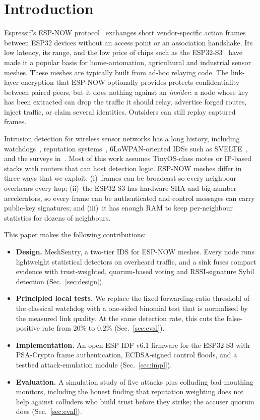 \documentclass[conference]{IEEEtran}
\begin{document}
\section{Introduction}
Espressif's ESP-NOW protocol~\cite{espnow} exchanges short vendor-specific
action frames between ESP32 devices without an access point or an association
handshake. Its low latency, its range, and the low price of chips such as the
ESP32-S3~\cite{esp32s3ds} have made it a popular basis for home-automation,
agricultural and industrial sensor meshes. These meshes are typically built
from ad-hoc relaying code. The link-layer encryption that ESP-NOW optionally
provides protects confidentiality between paired peers, but it does nothing
against an \emph{insider}: a node whose key has been extracted can drop the
traffic it should relay, advertise forged routes, inject traffic, or claim
several identities. Outsiders can still replay captured frames.

Intrusion detection for wireless sensor networks has a long history,
including watchdogs~\cite{marti2000watchdog}, reputation
systems~\cite{buchegger2002confidant,ganeriwal2008rfsn}, 6LoWPAN-oriented IDSs such as
SVELTE~\cite{raza2013svelte}, and the surveys
in~\cite{butun2014survey,zarpelao2017survey}. Most of this work assumes
TinyOS-class motes or IP-based stacks with routers that can host detection
logic. ESP-NOW meshes differ in three ways that we exploit:
(i)~frames can be broadcast so every neighbour overhears every hop;
(ii)~the ESP32-S3 has hardware SHA and big-number accelerators, so every frame can be
authenticated and control messages can carry public-key signatures; and
(iii)~it has enough RAM to keep per-neighbour statistics for dozens of neighbours.

This paper makes the following contributions:
\begin{itemize}
\item \textbf{Design.} MeshSentry, a two-tier IDS for ESP-NOW meshes. Every
node runs lightweight statistical detectors on overheard traffic, and a sink
fuses compact evidence with trust-weighted, quorum-based voting and RSSI-signature
Sybil detection (Sec.~\ref{sec:design}).
\item \textbf{Principled local tests.} We replace the fixed forwarding-ratio
threshold of the classical watchdog with a one-sided binomial test that is
normalised by the measured link quality. At the same detection rate, this cuts
the false-positive rate from 20\% to 0.2\% (Sec.~\ref{sec:eval}).
\item \textbf{Implementation.} An open ESP-IDF v6.1 firmware for the ESP32-S3
with PSA-Crypto frame authentication, ECDSA-signed control floods,
and a testbed attack-emulation module (Sec.~\ref{sec:impl}).
\item \textbf{Evaluation.} A simulation study of five attacks plus colluding
bad-mouthing monitors, including the honest finding that reputation
weighting does not help against colluders who build trust before they strike;
the accuser quorum does (Sec.~\ref{sec:eval}).
\end{itemize}
\end{document}
